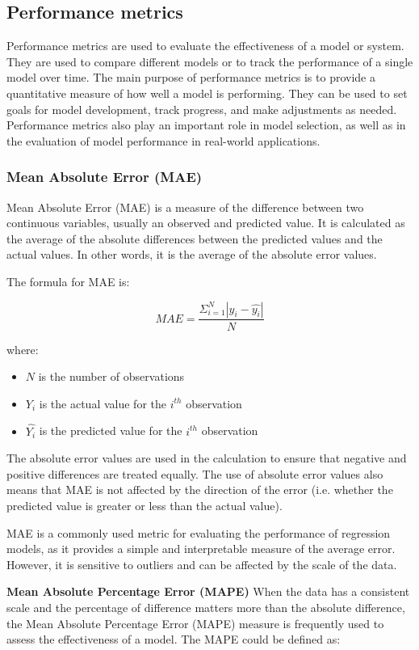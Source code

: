 \documentclass[a4paper]{article}
\begin{document}
\subsection{Performance metrics}
Performance metrics are used to evaluate the effectiveness of a model or system. They are used to compare different models or to track the performance of a single model over time. The main purpose of performance metrics is to provide a quantitative measure of how well a model is performing. They can be used to set goals for model development, track progress, and make adjustments as needed. Performance metrics also play an important role in model selection, as well as in the evaluation of model performance in real-world applications.
\subsubsection{Mean Absolute Error (MAE)}
Mean Absolute Error (MAE) is a measure of the difference between two continuous variables, usually an observed and predicted value. It is calculated as the average of the absolute differences between the predicted values and the actual values. In other words, it is the average of the absolute error values.

The formula for MAE is:

$$
MAE = \frac{\Sigma_{i=1}^{N}|y_{i}-\hat{y_{i}}|}{N}
$$

where:
\begin{itemize}
    \item $N$ is the number of observations
    \item $Y_{i}$ is the actual value for the $i^{th}$ observation
    \item $\hat{Y_{i}}$ is the predicted value for the $i^{th}$ observation
\end{itemize}

The absolute error values are used in the calculation to ensure that negative and positive differences are treated equally. The use of absolute error values also means that MAE is not affected by the direction of the error (i.e. whether the predicted value is greater or less than the actual value).

MAE is a commonly used metric for evaluating the performance of regression models, as it provides a simple and interpretable measure of the average error. However, it is sensitive to outliers and can be affected by the scale of the data.

\textbf{Mean Absolute Percentage Error (MAPE)}
When the data has a consistent scale and the percentage of difference matters more than the absolute difference, the Mean Absolute Percentage Error (MAPE) measure is frequently used to assess the effectiveness of a model. The MAPE could be defined as:
\end{document}
